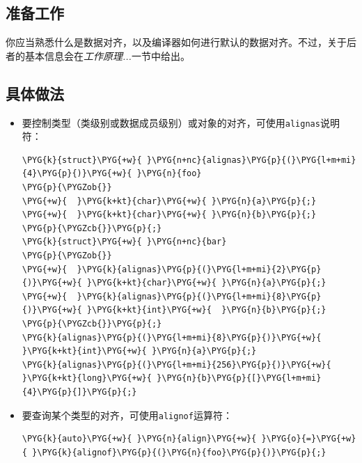 
\subsection{准备工作}



你应当熟悉什么是数据对齐，以及编译器如何进行默认的数据对齐。不过，关于后者的基本信息会在\textit{工作}\textit{原理...}一节中给出。



\subsection{具体做法}



\begin{itemize}
\item 要控制类型（类级别或数据成员级别）或对象的对齐，可使用\texttt{alignas}说明符：



\begin{codeblockbg}
\begin{Verbatim}[commandchars=\\\{\},breaklines=true,breakanywhere=true,fontsize=\codefont,xleftmargin=17bp]
\PYG{k}{struct}\PYG{+w}{ }\PYG{n+nc}{alignas}\PYG{p}{(}\PYG{l+m+mi}{4}\PYG{p}{)}\PYG{+w}{ }\PYG{n}{foo}
\PYG{p}{\PYGZob{}}
\PYG{+w}{  }\PYG{k+kt}{char}\PYG{+w}{ }\PYG{n}{a}\PYG{p}{;}
\PYG{+w}{  }\PYG{k+kt}{char}\PYG{+w}{ }\PYG{n}{b}\PYG{p}{;}
\PYG{p}{\PYGZcb{}}\PYG{p}{;}
\PYG{k}{struct}\PYG{+w}{ }\PYG{n+nc}{bar}
\PYG{p}{\PYGZob{}}
\PYG{+w}{  }\PYG{k}{alignas}\PYG{p}{(}\PYG{l+m+mi}{2}\PYG{p}{)}\PYG{+w}{ }\PYG{k+kt}{char}\PYG{+w}{ }\PYG{n}{a}\PYG{p}{;}
\PYG{+w}{  }\PYG{k}{alignas}\PYG{p}{(}\PYG{l+m+mi}{8}\PYG{p}{)}\PYG{+w}{ }\PYG{k+kt}{int}\PYG{+w}{  }\PYG{n}{b}\PYG{p}{;}
\PYG{p}{\PYGZcb{}}\PYG{p}{;}
\PYG{k}{alignas}\PYG{p}{(}\PYG{l+m+mi}{8}\PYG{p}{)}\PYG{+w}{   }\PYG{k+kt}{int}\PYG{+w}{ }\PYG{n}{a}\PYG{p}{;}
\PYG{k}{alignas}\PYG{p}{(}\PYG{l+m+mi}{256}\PYG{p}{)}\PYG{+w}{ }\PYG{k+kt}{long}\PYG{+w}{ }\PYG{n}{b}\PYG{p}{[}\PYG{l+m+mi}{4}\PYG{p}{]}\PYG{p}{;}
\end{Verbatim}
\end{codeblockbg}



\item 要查询某个类型的对齐，可使用\texttt{alignof}运算符：



\begin{codeblockbg}
\begin{Verbatim}[commandchars=\\\{\},breaklines=true,breakanywhere=true,fontsize=\codefont,xleftmargin=17bp]
\PYG{k}{auto}\PYG{+w}{ }\PYG{n}{align}\PYG{+w}{ }\PYG{o}{=}\PYG{+w}{ }\PYG{k}{alignof}\PYG{p}{(}\PYG{n}{foo}\PYG{p}{)}\PYG{p}{;}
\end{Verbatim}
\end{codeblockbg}

\end{itemize}


